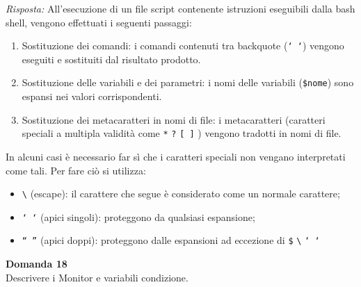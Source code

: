 \documentclass{article}
\newenvironment{problem}[2][Domanda]
    { \begin{mdframed}[backgroundcolor=gray!20] \textbf{#1 #2} \\}
    {  \end{mdframed}}
\newenvironment{solution}
    {\textit{Risposta:}}
    {}
\begin{document}
\begin{solution}
All’esecuzione di un file script contenente istruzioni eseguibili dalla bash shell, vengono effettuati i seguenti passaggi:
\begin{enumerate}
    \item Sostituzione dei comandi: i comandi contenuti tra backquote (\texttt{` `}) vengono eseguiti e sostituiti dal risultato prodotto.
    \item Sostituzione delle variabili e dei parametri: i nomi delle variabili (\texttt{\$nome}) sono espansi nei valori corrispondenti.
    \item  Sostituzione dei metacaratteri in nomi di file: i metacaratteri (caratteri speciali a multipla validità come \texttt{*}  \texttt{?}  \texttt{[ ]} ) vengono tradotti in nomi di file.
\end{enumerate}
In alcuni casi è necessario far sì che i caratteri speciali non vengano interpretati come tali.\newline
Per fare ciò si utilizza:
\begin{itemize}
    \item \texttt{\textbackslash} (escape): il carattere che segue è considerato come un normale carattere;
    \item \texttt{‘ ‘} (apici singoli): proteggono da qualsiasi espansione;
    \item \texttt{“ ”} (apici doppi): proteggono dalle espansioni ad eccezione di \texttt{\$} \texttt{\textbackslash} \texttt{` `}
\end{itemize}
\end{solution}
\begin{problem}{18}
Descrivere i Monitor e variabili condizione.
\end{problem}
\end{document}
